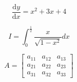 \documentclass{jarticle}
\begin{document}
\begin{equation}
    \frac{\mathrm{d}y}{\mathrm{d}x}=x^2 + 3x + 4
\end{equation}

\begin{equation}
    I=\int_{0}^{\frac{1}{2}} \frac{x}{\sqrt{1-x^2}}  dx
\end{equation}

\begin{equation}  
  A=\begin{bmatrix}
    a_{11} & a_{12} & a_{13}\\
    a_{21} & a_{22} & a_{23}\\
    a_{31} & a_{32} & a_{33}
  \end{bmatrix}
\end{equation}

  




        
\end{document}
